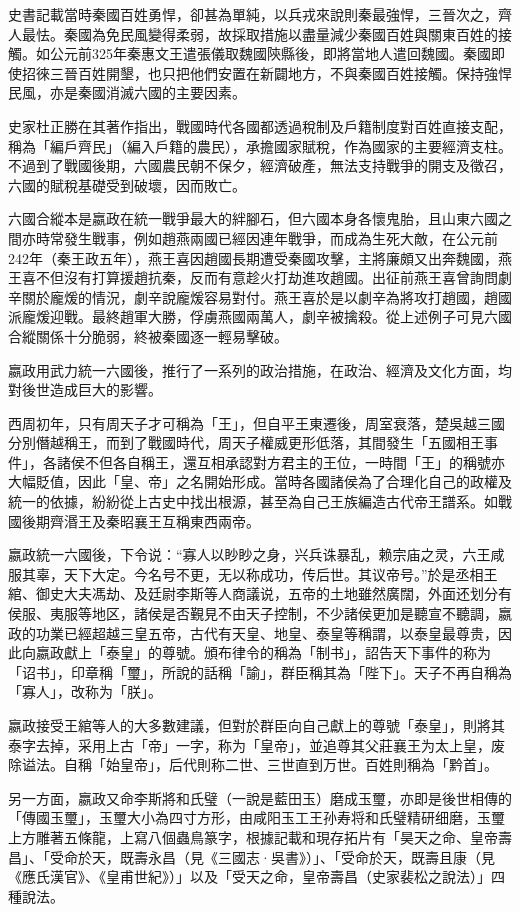 史書記載當時秦國百姓勇悍，卻甚為單純，以兵戎來說則秦最強悍，三晉次之，齊人最怯。秦國為免民風變得柔弱，故採取措施以盡量減少秦國百姓與關東百姓的接觸。如公元前325年秦惠文王遣張儀取魏國陝縣後，即將當地人遣回魏國。秦國即使招徠三晉百姓開墾，也只把他們安置在新闢地方，不與秦國百姓接觸。保持強悍民風，亦是秦國消滅六國的主要因素。

史家杜正勝在其著作指出，戰國時代各國都透過稅制及戶籍制度對百姓直接支配，稱為「編戶齊民」（編入戶籍的農民），承擔國家賦稅，作為國家的主要經濟支柱。不過到了戰國後期，六國農民朝不保夕，經濟破產，無法支持戰爭的開支及徵召，六國的賦稅基礎受到破壞，因而敗亡。

六國合縱本是嬴政在統一戰爭最大的絆腳石，但六國本身各懷鬼胎，且山東六國之間亦時常發生戰事，例如趙燕兩國已經因連年戰爭，而成為生死大敵，在公元前242年（秦王政五年），燕王喜因趙國長期遭受秦國攻擊，主將廉頗又出奔魏國，燕王喜不但沒有打算援趙抗秦，反而有意趁火打劫進攻趙國。出征前燕王喜曾詢問劇辛關於龐煖的情況，劇辛說龐煖容易對付。燕王喜於是以劇辛為將攻打趙國，趙國派龐煖迎戰。最終趙軍大勝，俘虜燕國兩萬人，劇辛被擒殺。從上述例子可見六國合縱關係十分脆弱，終被秦國逐一輕易擊破。

嬴政用武力統一六國後，推行了一系列的政治措施，在政治、經濟及文化方面，均對後世造成巨大的影響。

西周初年，只有周天子才可稱為「王」，但自平王東遷後，周室衰落，楚吳越三國分別僭越稱王，而到了戰國時代，周天子權威更形低落，其間發生「五國相王事件」，各諸侯不但各自稱王，還互相承認對方君主的王位，一時間「王」的稱號亦大幅貶值，因此「皇、帝」之名開始形成。當時各國諸侯為了合理化自己的政權及統一的依據，紛紛從上古史中找出根源，甚至為自己王族編造古代帝王譜系。如戰國後期齊湣王及秦昭襄王互稱東西兩帝。

嬴政統一六國後，下令说：“寡人以眇眇之身，兴兵诛暴乱，赖宗庙之灵，六王咸服其辜，天下大定。今名号不更，无以称成功，传后世。其议帝号。”於是丞相王綰、御史大夫馮劫、及廷尉李斯等人商議说，五帝的土地雖然廣闊，外面还划分有侯服、夷服等地区，諸侯是否覲見不由天子控制，不少諸侯更加是聽宣不聽調，嬴政的功業已經超越三皇五帝，古代有天皇、地皇、泰皇等稱謂，以泰皇最尊贵，因此向嬴政獻上「泰皇」的尊號。頒布律令的稱為「制书」，詔告天下事件的称为「诏书」，印章稱「璽」，所說的話稱「諭」，群臣稱其為「陛下」。天子不再自稱為「寡人」，改称为「朕」。

嬴政接受王綰等人的大多數建議，但對於群臣向自己獻上的尊號「泰皇」，則將其泰字去掉，采用上古「帝」一字，称为「皇帝」，並追尊其父莊襄王为太上皇，废除谥法。自稱「始皇帝」，后代則称二世、三世直到万世。百姓則稱為「黔首」。

另一方面，嬴政又命李斯將和氏璧（一說是藍田玉）磨成玉璽，亦即是後世相傳的「傳國玉璽」，玉璽大小為四寸方形，由咸阳玉工王孙寿将和氏璧精研细磨，玉璽上方雕著五條龍，上寫八個蟲鳥篆字，根據記載和現存拓片有「昊天之命、皇帝壽昌」、「受命於天，既壽永昌（見《三國志·吳書》）」、「受命於天，既壽且康（見《應氏漢官》、《皇甫世紀》）」以及「受天之命，皇帝壽昌（史家裴松之說法）」四種說法。

